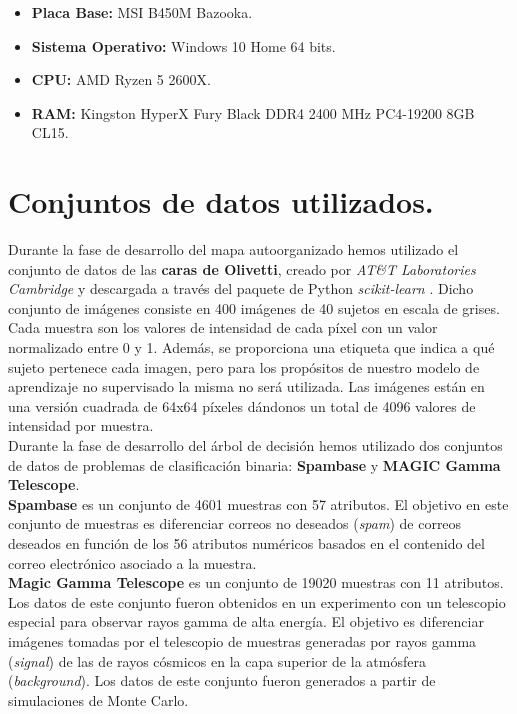 \begin{itemize}
	\item \textbf{Placa Base:} MSI B450M Bazooka.
	\item \textbf{Sistema Operativo:} Windows 10 Home 64 bits.
	\item \textbf{CPU:} AMD Ryzen 5 2600X.
	\item \textbf{RAM:} Kingston HyperX Fury Black DDR4 2400 MHz PC4-19200 8GB CL15.
\end{itemize}
\section{Conjuntos de datos utilizados.}

Durante la fase de desarrollo del mapa autoorganizado hemos utilizado el conjunto de datos de las \textbf{caras de Olivetti}, creado por \textit{AT\&T Laboratories Cambridge} y descargada a través del paquete de Python \textit{scikit-learn} \cite{olivetti}. Dicho conjunto de imágenes consiste en 400 imágenes de 40 sujetos en escala de grises. Cada muestra son los valores de intensidad de cada píxel con un valor normalizado entre 0 y 1. Además, se proporciona una etiqueta que indica a qué sujeto pertenece cada imagen, pero para los propósitos de nuestro modelo de aprendizaje no supervisado la misma no será utilizada. Las imágenes están en una versión cuadrada de 64x64 píxeles dándonos un total de 4096 valores de intensidad por muestra. \\

Durante la fase de desarrollo del árbol de decisión hemos utilizado dos conjuntos de datos de problemas de clasificación binaria: \textbf{Spambase} y \textbf{MAGIC Gamma Telescope}.\\

\textbf{Spambase} \cite{spambase} es un conjunto de 4601 muestras con 57 atributos. El objetivo en este conjunto de muestras es diferenciar correos no deseados (\textit{spam}) de correos deseados en función de los 56 atributos numéricos basados en el contenido del correo electrónico asociado a la muestra.\\

\textbf{Magic Gamma Telescope} \cite{magic04} es un conjunto de 19020 muestras con 11 atributos. Los datos de este conjunto fueron obtenidos en un experimento con un telescopio especial para observar rayos gamma de alta energía. El objetivo es diferenciar imágenes tomadas por el telescopio de muestras generadas por rayos gamma (\textit{signal}) de las de rayos cósmicos en la capa superior de la atmósfera (\textit{background}). Los datos de este conjunto fueron generados a partir de simulaciones de Monte Carlo.\\

